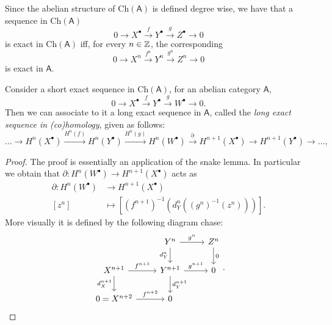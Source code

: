 \begin{rem}
	Since the abelian structure of $\mathrm{Ch}(\mathsf{A})$ is defined degree wise, we have
	that a sequence in $\mathrm{Ch}(\mathsf{A})$
	\begin{equation}
	0 \to X^\bullet \xrightarrow{f} Y^\bullet \xrightarrow{g} 
	Z^\bullet \to 0
	\end{equation} 
	is exact in $\mathrm{Ch}(\mathsf{A})$ iff, for every $n \in \mathbb{Z}$, the corresponding
	\begin{equation}
	0 \to X^n \xrightarrow{f^n} Y^n \xrightarrow{g^n}
	Z^n \to 0
	\end{equation} 
	is exact in $\mathsf{A}$.
\end{rem}

\begin{thm}
	Consider a short exact sequence in $\mathrm{Ch}(\mathsf{A})$, for an abelian category $\mathsf{A}$,
	\begin{equation}
	0 \to X^\bullet \xrightarrow{f} Y^\bullet \xrightarrow{g} W^\bullet \to 0
	.\end{equation} 
	Then we can associate to it a long exact sequence in $\mathsf{A}$, called the
	{\em long exact sequence in (co)homology}, given as follows:
	\begin{equation}
		\ldots \to H^n(X^\bullet) \xrightarrow{H^n(f)} H^n(Y^\bullet) \xrightarrow{H^n(g)} 
		H^n (W^\bullet) \xrightarrow{\partial} H^{n+1}(X^\bullet) \to
		H^{n+1}(Y^\bullet) \to \ldots
	,\end{equation} 
\end{thm}
\begin{proof}
	The proof is essentially an application of the snake lemma.
	In particular we obtain that $\partial: H^n(W^\bullet) \to H^{n+1}(X^\bullet)$ acts as
	\begin{align}
		\partial: H^n(W^\bullet) &\to H^{n+1}(X^\bullet) \\
		[z^n] &\mapsto \left[ (f^{n+1})^{-1} \left( d_Y^n ((g^n)^{-1}(z^n)) \right) \right]
	.\end{align} 
	More visually it is defined by the following diagram chase:
	\begin{equation}
	\begin{tikzcd}
		&
		Y^n \arrow[r, "g^n", rightarrow] \arrow[d, "d_Y^n"', rightarrow] &
		Z^n \arrow[d, "0", rightarrow] \\
		X^{n+1} \arrow[r, "f^{n+1}", rightarrow] \arrow[d, "d_X^{n+1}"', rightarrow] &
		Y^{n+1} \arrow[r, "g^{n+1}", rightarrow] \arrow[d, "d_Y^{n+1}", rightarrow] &
		0 \\
		0 = X^{n+2} \arrow[r, "f^{n+2}", rightarrow] &
		0
	\end{tikzcd}
	.\end{equation} 
\end{proof}

